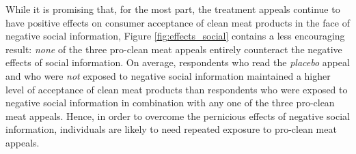 \documentclass[12pt]{article}
\newcommand{\note}[1]{\textit{\textcolor{red}{$<$note$>$ #1 $<$/note$>$}}}
\begin{document}
While it is promising that, for the most part, the treatment appeals continue to have positive effects on consumer acceptance of clean meat products in the face of negative social information, Figure \ref{fig:effects_social} contains a less encouraging result: \textit{none} of the three pro-clean meat appeals entirely counteract the negative effects of social information. On average, respondents who read the \textit{placebo} appeal and who were \textit{not} exposed to negative social information maintained a higher level of acceptance of clean meat products than respondents who were exposed to negative social information in combination with any one of the three pro-clean meat appeals. Hence, in order to overcome the pernicious effects of negative social information, individuals are likely to need repeated exposure to pro-clean meat appeals.





\end{document}
